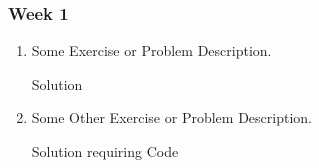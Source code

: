 \documentclass[12pt]{amsart}
\begin{document}
\subsubsection{Week 1}
\begin{enumerate}
\item Some Exercise or Problem Description.

Solution
\item Some Other Exercise or Problem Description.

Solution requiring Code
\lstset{language=Erlang}

 
\end{enumerate}
\end{document}
